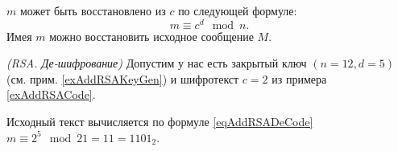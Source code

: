 $m$ может быть восстановлено из $c$ по следующей формуле:
\begin{equation}
m \equiv c^d \mod{n}.
\label{eqAddRSADeCode}
\end{equation}
Имея $m$ можно восстановить исходное сообщение $M$.
\begin{example}
\emph{(RSA. Де-шифрование)}
Допустим у нас есть закрытый ключ $\left(n=12, d=5\right)$ (см. прим. \ref{exAddRSAKeyGen}) и шифротекст $c = 2$ из примера \ref{exAddRSACode}.

Исходный текст вычисляется по формуле \eqref{eqAddRSADeCode} $m \equiv 2^5 \mod{21} = 11 = 1101_2$.
\label{exAddRSADeCode}
\end{example}
